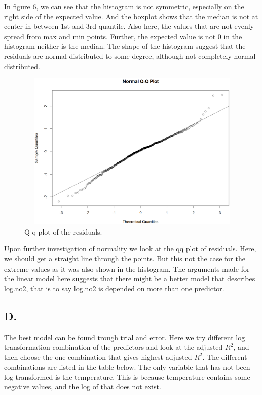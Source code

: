 \documentclass[a4paper,12pt]{article}
\begin{document}
In figure 6, we can see that the histogram is not symmetric, especially on the right side of the expected value. And the boxplot shows that the median is not at center in between 1st and 3rd quantile. Also here, the values that are not evenly spread from max and min points. Further, the expected value is not 0 in the histogram neither is the median. The shape of the histogram suggest that the residuals are normal distributed to some degree, although not completely normal distributed.

\begin{figure}[H]
\centerline{\includegraphics[width=4.5in, height=3in]{Q-Qplot.png}}
\caption{Q-q plot of the residuals.}
\label{fig}
\end{figure}

Upon further investigation of normality we look at the qq plot of residuals. Here, we should get a straight line through the points. But this not the case for the extreme values as it was also shown in the histogram. The arguments made for the linear model here suggests that there might be a better model that describes log.no2, that is to say log.no2 is depended on more than one predictor.


\subsection*{D. }
The best model can be found trough trial and error. Here we try different log transformation combination of the predictors and look at the adjusted $R^2$, and then choose the one combination that gives highest adjusted $R^2$. The different combinations are listed in the table below. The only variable that has not been log transformed is the temperature. This is because temperature contains some negative values, and the log of that does not exist. 
\end{document}
